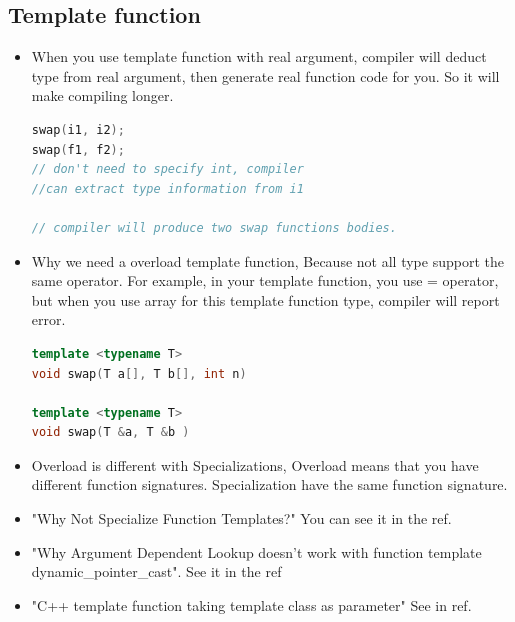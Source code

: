 \documentclass[a4paper,12pt,twoside]{book}
\begin{document}
\subsection{Template function}
\begin{itemize}
\item When you use template function with real argument, compiler will deduct type from real argument, then generate real function code for you.  So it will make compiling longer.
\begin{lstlisting}[frame=single, language=c++]
swap(i1, i2);
swap(f1, f2);
// don't need to specify int, compiler
//can extract type information from i1

// compiler will produce two swap functions bodies.
\end{lstlisting}

\item Why we need a overload template function, Because not all type support the same operator. For example, in your template function, you use = operator, but when you use array for this template function type, compiler will report error.
\begin{lstlisting}[frame=single, language=c++]
template <typename T>
void swap(T a[], T b[], int n)

template <typename T>
void swap(T &a, T &b )
\end{lstlisting}

\item Overload is different with Specializations, Overload means that you have different function signatures. Specialization have the same function signature.

\item "Why Not Specialize Function Templates?" You can see it in the ref.

\item "Why Argument Dependent Lookup doesn't work with function template dynamic\_pointer\_cast". See it in the ref

\item "C++ template function taking template class as parameter" See in ref.
\end{itemize}
\end{document}
